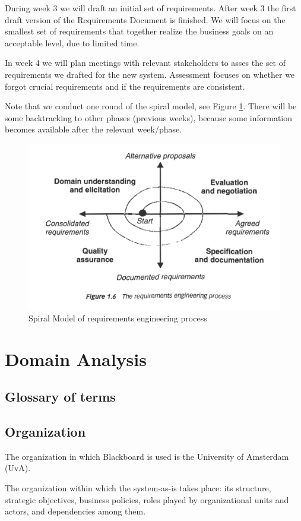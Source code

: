 During week 3 we will draft an initial set of requirements. After week 3 the first draft version of the Requirements Document is finished. We will focus on the smallest set of requirements that together realize the business goals on an acceptable level, due to limited time. 

In week 4 we will plan meetings with relevant stakeholders to asses the set of requirements we drafted for the new system. Assessment focuses on whether we forgot crucial requirements and if the requirements are consistent.  

Note that we conduct one round of the spiral model, see Figure \ref{fig:spiral_model}. There will be some backtracking to other phases (previous weeks), because some information becomes available after the relevant week/phase. 

\begin{figure}[h]
	\centering
	\includegraphics[width=0.75\linewidth]{images/re_process}
	\caption{Spiral Model of requirements engineering process}
	\label{fig:spiral_model}
\end{figure}
\chapter{Domain Analysis}

\section{Glossary of terms}

\section{Organization}
The organization in which Blackboard is used is the University of Amsterdam (UvA). 

The organization within which the system-as-is takes place: its structure, strategic objectives,
business policies, roles played by organizational units and actors, and dependencies
among them.

